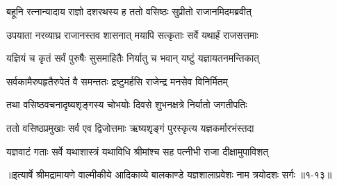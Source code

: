 \twolineshloka
{बहूनि रत्नान्यादाय राज्ञो दशरथस्य ह}
{ततो वसिष्ठः सुप्रीतो राजानमिदमब्रवीत्} %

\twolineshloka
{उपयाता नरव्याघ्र राजानस्तव शासनात्}
{मयापि सत्कृताः सर्वे यथार्हं राजसत्तमाः} %

\twolineshloka
{यज्ञियं च कृतं सर्वं पुरुषैः सुसमाहितैः}
{निर्यातु च भवान् यष्टुं यज्ञायतनमन्तिकात्} %

\twolineshloka
{सर्वकामैरुपहृतैरुपेतं वै समन्ततः}
{द्रष्टुमर्हसि राजेन्द्र मनसेव विनिर्मितम्} %

\twolineshloka
{तथा वसिष्ठवचनादृष्यशृङ्गस्य चोभयोः}
{दिवसे शुभनक्षत्रे निर्यातो जगतीपतिः} %

\twolineshloka
{ततो वसिष्ठप्रमुखाः सर्व एव द्विजोत्तमाः}
{ऋष्यशृङ्गं पुरस्कृत्य यज्ञकर्मारभंस्तदा} %

\twolineshloka
{यज्ञवाटं गताः सर्वे यथाशास्त्रं यथाविधि}
{श्रीमांश्च सह पत्नीभी राजा दीक्षामुपाविशत्} %


॥इत्यार्षे श्रीमद्रामायणे वाल्मीकीये आदिकाव्ये बालकाण्डे यज्ञशालाप्रवेशः नाम त्रयोदशः सर्गः ॥१-१३॥
